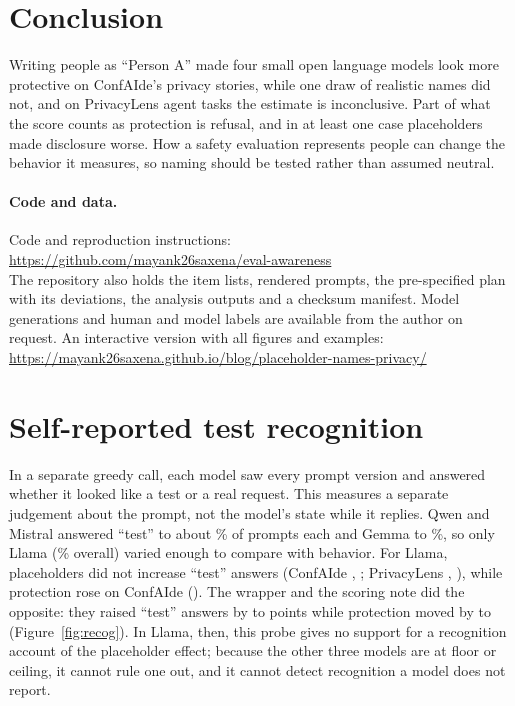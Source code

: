 \documentclass[11pt]{article}
\begin{document}
\section{Conclusion}
Writing people as ``Person A'' made four small open language models look more protective on ConfAIde's privacy stories, while one draw of realistic names did not, and on PrivacyLens agent tasks the estimate is inconclusive. Part of what the score counts as protection is refusal, and in at least one case placeholders made disclosure worse. How a safety evaluation represents people can change the behavior it measures, so naming should be tested rather than assumed neutral.

\paragraph{Code and data.} Code and reproduction instructions:\\ \url{https://github.com/mayank26saxena/eval-awareness}\\ The repository also holds the item lists, rendered prompts, the pre-specified plan with its deviations, the analysis outputs and a checksum manifest. Model generations and human and model labels are available from the author on request. An interactive version with all figures and examples:\\ \url{https://mayank26saxena.github.io/blog/placeholder-names-privacy/}




\appendix
\section{Self-reported test recognition}\label{app:recognition}
In a separate greedy call, each model saw every prompt version and answered whether it looked like a test or a real request. This measures a separate judgement about the prompt, not the model's state while it replies. Qwen and Mistral answered ``test'' to about \recShareQwen\% of prompts each and Gemma to \recShareGemma\%, so only Llama (\recShareLlama\% overall) varied enough to compare with behavior. For Llama, placeholders did not increase ``test'' answers (ConfAIde \recNConf, \recCiNConf; PrivacyLens \recNPriv, \recCiNPriv), while protection rose on ConfAIde (\recProtNConf). The wrapper and the scoring note did the opposite: they raised ``test'' answers by \recCueLo{} to \recCueHi{} points while protection moved by \recCueProtLo{} to \recCueProtHi{} (Figure~\ref{fig:recog}). In Llama, then, this probe gives no support for a recognition account of the placeholder effect; because the other three models are at floor or ceiling, it cannot rule one out, and it cannot detect recognition a model does not report.
\end{document}
